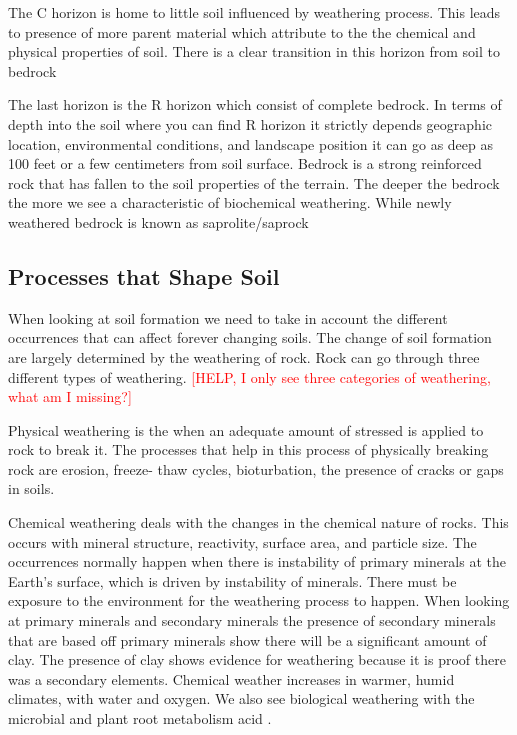 The C horizon is home to little soil influenced by weathering process. This leads to presence of more parent material which attribute to the the chemical and physical properties of soil. There is a clear transition in this horizon from soil to bedrock

The last horizon is the R horizon which consist of complete bedrock. In terms of depth into the soil where you can find R horizon it strictly depends geographic location, environmental conditions, and landscape position it can go as deep as 100 feet or a few centimeters from soil surface. Bedrock is a strong reinforced rock that has fallen to the soil properties of the terrain. The deeper the bedrock the more we see a characteristic of biochemical weathering. While newly weathered bedrock is known as saprolite/saprock 

\subsection{Processes that Shape Soil}

When looking at soil formation we need to take in account the different occurrences that can affect forever changing soils. The change of soil formation are largely determined by the weathering of rock. Rock can go through three different types of weathering. \textcolor{red}{[HELP, I only see three categories of weathering, what am I missing?]}

Physical weathering is the when an adequate amount of stressed is applied to rock to break it. The processes that help in this process of physically breaking rock are erosion, freeze- thaw cycles, bioturbation, the presence of cracks or gaps in soils. 

Chemical weathering deals with the changes in the chemical nature of rocks. This occurs with mineral structure, reactivity, surface area, and particle size. The occurrences normally happen when there is instability of primary minerals at the Earth's surface, which is driven by instability of minerals. There must be exposure to the environment for the weathering process to happen. When looking at primary minerals and secondary minerals the presence of secondary minerals that are based off primary minerals show there will be a significant amount of clay. The presence of clay shows evidence for weathering because it is proof there was a secondary elements. Chemical weather increases in warmer, humid climates, with water and oxygen. We also see biological weathering with the microbial and plant root metabolism acid \citep{brady2007colloidal}. 

